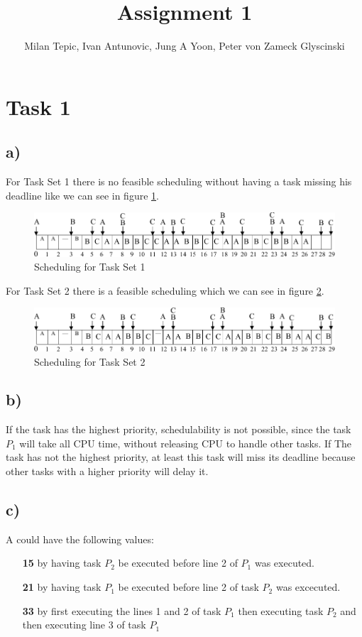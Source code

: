 \documentclass[10pt,a4paper]{article}
\author{Milan Tepic, Ivan Antunovic, Jung A Yoon, Peter von Zameck Glyscinski}
\title{Assignment 1}
\begin{document}
\maketitle

\section*{Task 1}
\subsection*{a)}
For Task Set 1 there is no feasible scheduling without having a task missing his deadline like we can see in figure \ref{fig:timming-diagram1}. 
\begin{figure}[h]
\includegraphics[width=\linewidth]{timing-diagram1.pdf}
\caption{Scheduling for Task Set 1}
\label{fig:timming-diagram1}
\end{figure}

For Task Set 2 there is a feasible scheduling which we can see in figure \ref{fig:timming-diagram2}.

\begin{figure}[h]
\includegraphics[width=\linewidth]{timing-diagram2.pdf}
\caption{Scheduling for Task Set 2}
\label{fig:timming-diagram2}
\end{figure}

\subsection*{b)}
If the task has the highest priority, schedulability is not possible, since the task $P_1$ will take all CPU time, without releasing CPU to handle other tasks.
\newline
If The task has not the highest priority, at least this task will miss its deadline because other tasks with a higher priority will delay it.
\subsection*{c)}
A could have the following values:
\begin{itemize}
\item[\textbf{15}] by having task $P_2$ be executed before line 2 of $P_1$ was executed.
\item[\textbf{21}] by having task $P_1$ be executed before line 2 of task $P_2$ was excecuted.
\item[\textbf{33}] by first executing the lines 1 and 2 of task $P_1$ then executing task $P_2$ and then executing line 3 of task $P_1$
\end{itemize}
\end{document}
